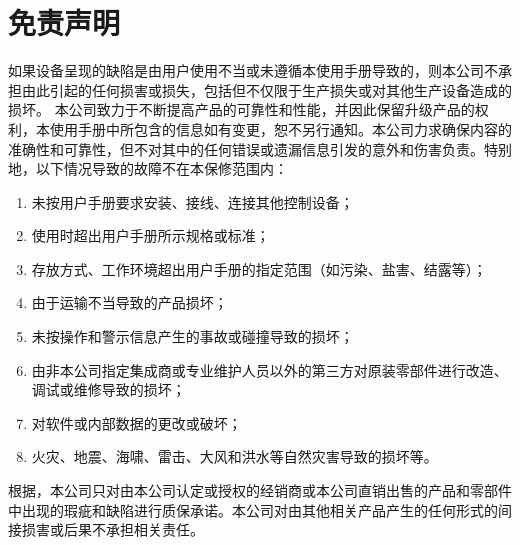 \section{免责声明}
如果设备呈现的缺陷是由用户使用不当或未遵循本使用手册导致的，则本公司不承担由此引起的任何损害或损失，包括但不仅限于生产损失或对其他生产设备造成的损坏。
本公司致力于不断提高产品的可靠性和性能，并因此保留升级产品的权利，本使用手册中所包含的信息如有变更，恕不另行通知。本公司力求确保{\ThisBook}内容的准确性和可靠性，但不对其中的任何错误或遗漏信息引发的意外和伤害负责。特别地，以下情况导致的故障不在本保修范围内：
\begin{enumerate}
\item 未按用户手册要求安装、接线、连接其他控制设备；
\item 使用时超出用户手册所示规格或标准；
\item 存放方式、工作环境超出用户手册的指定范围（如污染、盐害、结露等）；
\item 由于运输不当导致的产品损坏；
\item 未按操作和警示信息产生的事故或碰撞导致的损坏；
\item 由非本公司指定集成商或专业维护人员以外的第三方对原装零部件进行改造、调试或维修导致的损坏；
\item 对软件或内部数据的更改或破坏；
\item 火灾、地震、海啸、雷击、大风和洪水等自然灾害导致的损坏等。
\end{enumerate}

根据{\TheSec}，本公司只对由本公司认定或授权的经销商或本公司直销出售的产品和零部件中出现的瑕疵和缺陷进行质保承诺。本公司对由其他相关产品产生的任何形式的间接损害或后果不承担相关责任。

